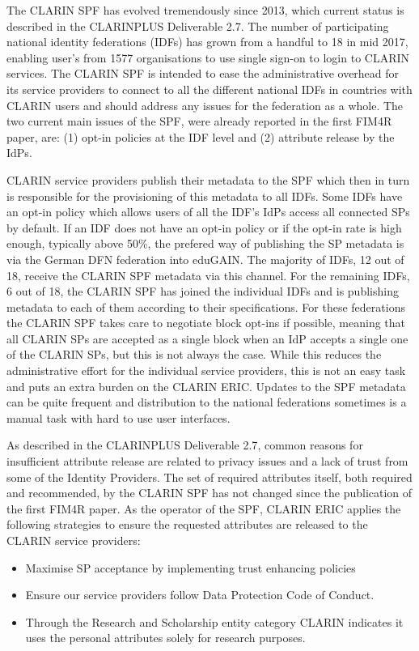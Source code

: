 \documentclass[fleqn,10pt]{wlscirep}
\begin{document}
{The CLARIN SPF has evolved tremendously since 2013, which current status is described in the CLARINPLUS Deliverable 2.7. The number of participating national identity federations (IDFs) has grown from a handful to 18 in mid 2017, enabling user's from 1577 organisations to use single sign-on to login to CLARIN services. The CLARIN SPF is intended to ease the administrative overhead for its service providers to connect to all the different national IDFs in countries with CLARIN users and should address  any issues for the federation as a whole. The two current main issues of the SPF, were already reported in the first FIM4R paper, are: (1) opt-in policies at the IDF level and (2) attribute release by the IdPs. 

CLARIN service providers publish their metadata to the SPF which then in turn is responsible for the provisioning of this metadata to all IDFs. Some IDFs have an opt-in policy which allows users of all the IDF’s IdPs access all connected SPs by default.  If an IDF does not have an opt-in policy or if the opt-in rate is high enough, typically above 50\%, the prefered way of publishing the SP metadata is via the German DFN federation into eduGAIN. The majority of IDFs, 12 out of 18, receive the CLARIN SPF metadata via this channel. For the remaining IDFs, 6 out of 18, the CLARIN SPF has joined the individual IDFs and is publishing metadata to each of them according to their specifications. For these federations the CLARIN SPF takes care to negotiate block opt-ins if possible, meaning that all CLARIN SPs are accepted as a single block when an IdP accepts a single one of the CLARIN SPs, but this is not always the case. While this reduces the administrative effort  for the individual service providers, this is not an easy task and puts an extra  burden on the CLARIN ERIC. Updates to the SPF metadata can be quite frequent and distribution to the national federations sometimes is a manual task with hard to use user interfaces.

As described in the CLARINPLUS Deliverable 2.7\cite{vanuyt}, common reasons for insufficient attribute release are related to privacy issues and a lack of trust from some of the Identity Providers. The set of required attributes itself, both required and recommended, by the CLARIN SPF has not changed since the publication of the  first FIM4R paper. As the operator of the SPF, CLARIN ERIC applies the following strategies to ensure the requested attributes are released to the CLARIN  service providers:
\begin{itemize}
\item Maximise SP acceptance by implementing trust enhancing policies
\item Ensure our service providers follow Data Protection Code of Conduct.
\item Through the Research and Scholarship entity category CLARIN indicates it uses the personal attributes solely for research purposes.
\end{itemize}

}
\end{document}
